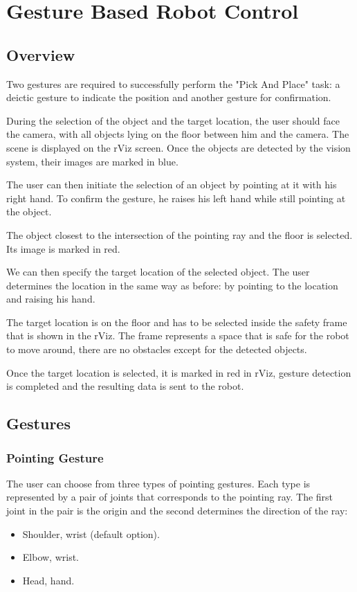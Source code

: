 \chapter{Gesture Based Robot Control}

\section{Overview}
Two gestures are required to successfully perform the "Pick And Place" task:
a deictic gesture to indicate the position and another gesture for confirmation.\par
During the selection of the object and the target location, the user should face the camera, with all objects lying on the floor between him and the camera. The scene is displayed on the rViz screen. Once the objects are detected by the vision system, their images are marked in blue.\par
The user can then initiate the selection of an object by pointing at it with his right hand. To confirm the gesture, he raises his left hand while still pointing at the object.\par
The object closest to the intersection of the pointing ray and the floor is selected. Its image is marked in red.\par
We can then specify the target location of the selected object. The user determines the location in the same way as before: by pointing to the location and raising his hand.\par
The target location is on the floor and  has to be selected inside the safety frame that is shown in the rViz. The frame represents a space that is safe for the robot to move around, there are no obstacles except for the detected objects.\par
Once the target location is selected, it is marked in red in rViz, gesture detection is completed and the resulting data is sent to the robot.\par

\section{Gestures}

\subsection{Pointing Gesture}
The user can choose from three types of pointing gestures. Each type is represented by a pair of joints that corresponds to the pointing ray. The first joint in the pair is the origin and the second determines the direction of the ray:\par
\begin{itemize}
	\item Shoulder, wrist (default option).
    \item Elbow, wrist.
    \item Head, hand.
\end{itemize}

